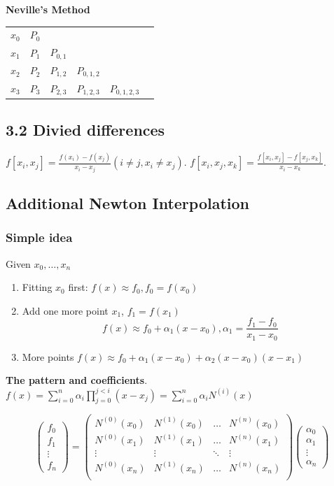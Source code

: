 \documentclass[11pt]{article}
\begin{document}
\textbf{Neville's Method}
\begin{tabular}{c c c c c c}
$x_0$ & $P_0$ &           &             &            \\
$x_1$ & $P_1$ & $P_{0,1}$ &             &            \\
$x_2$ & $P_2$ & $P_{1,2}$ & $P_{0,1,2}$ &            \\
$x_3$ & $P_3$ & $P_{2,3}$ & $P_{1,2,3}$ & $P_{0,1,2,3}$\\
\end{tabular}
\subsection{3.2 Divied differences}
\label{sec:org59d9f25}
\(f[x_i,x_j]=\frac{f(x_i)-f(x_j)}{x_i-x_j}(i\neq j, x_i\neq x_j)\).
\(f[x_i,x_j,x_k]=\frac{f[x_i,x_j]-f[x_j,x_k]}{x_i-x_k}\).
\subsection{Additional Newton Interpolation}
\label{sec:orgbc4d6d4}
\subsubsection{Simple idea}
\label{sec:org216f6f5}
Given \(x_0,\dots,x_n\)
\begin{enumerate}
\item Fitting $x_0$ first: $f(x)\approx f_0, f_0=f(x_0)$
\item Add one more point $x_1$, $f_1=f(x_1)$
\begin{equation*}
f(x) \approx f_0+\alpha_1(x-x_0),\alpha_1=\frac{f_1-f_0}{x_1-x_0}
\end{equation*}
\item More points $f(x)\approx f_0+\alpha_1(x-x_0)+\alpha_2(x-x_0)(x-x_1)$
\end{enumerate}

\textbf{The pattern and coefficients}.
\(f(x)=\displaystyle\sum_{i=0}^n\alpha_i
    \displaystyle\prod_{j=0}^{j<i}(x-x_j)
    =\displaystyle\sum_{i=0}^n\alpha_iN^{(i)}(x)\)

\begin{equation*}
\begin{pmatrix}
f_0\\
f_1\\
\vdots\\
f_n
\end{pmatrix}=
\begin{pmatrix}
N^{(0)}(x_0) & N^{(1)}(x_0) & \dots & N^{(n)}(x_0)\\
N^{(0)}(x_1) & N^{(1)}(x_1) & \dots & N^{(n)}(x_1)\\
\vdots & \vdots & \ddots&\vdots\\
N^{(0)}(x_n) & N^{(1)}(x_n) & \dots & N^{(n)}(x_n)\\
\end{pmatrix}
\begin{pmatrix}
\alpha_0\\
\alpha_1\\
\vdots\\
\alpha_n
\end{pmatrix}
\end{equation*}
\end{document}
